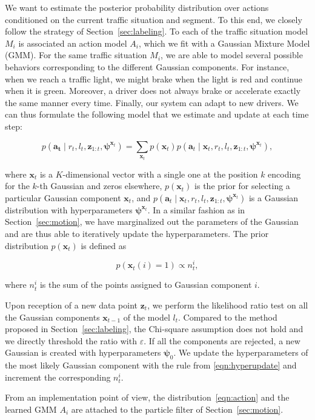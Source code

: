 We want to estimate the posterior probability distribution over actions
conditioned on the current traffic situation and segment. To this end, we
closely follow the strategy of Section~\ref{sec:labeling}. To each of the
traffic situation model $M_i$ is associated an action model $A_i$, which we fit
with a Gaussian Mixture Model (GMM). For the same traffic situation $M_i$, we
are able to model several possible behaviors corresponding to the different
Gaussian components. For instance, when we reach a traffic light, we might brake
when the light is red and continue when it is green. Moreover, a driver does not
always brake or accelerate exactly the same manner every time. Finally, our
system can adapt to new drivers. We can thus formulate the following model that
we estimate and update at each time step:

\begin{equation}
\label{eqn:action}
p(\mathbf{a_t} \mid r_t, l_t,\mathbf{z}_{1:t},\boldsymbol{\psi}^{\mathbf{x}_t})=
\sum_{\mathbf{x}_t} p(\mathbf{x}_t)p(\mathbf{a}_t\mid\mathbf{x}_t,r_t,l_t,
\mathbf{z}_{1:t},\boldsymbol{\psi}^{\mathbf{x}_t}),
\end{equation}

where $\mathbf{x}_t$ is a $K$-dimensional vector with a single one at the
position $k$ encoding for the $k$-th Gaussian and zeros elsewhere,
$p(\mathbf{x}_t)$ is the prior for selecting a particular Gaussian component
$\mathbf{x}_t$, and $p(\mathbf{a}_t\mid\mathbf{x}_t,r_t,l_t,
\mathbf{z}_{1:t},\boldsymbol{\psi}^{\mathbf{x}_t})$ is a Gaussian distribution
with hyperparameters $\boldsymbol{\psi}^{\mathbf{x}_t}$. In a similar fashion as
in Section~\ref{sec:motion}, we have marginalized out the parameters of the
Gaussian and are thus able to iteratively update the hyperparameters. The
prior distribution $p(\mathbf{x}_t)$ is defined as

\begin{equation}
\label{eqn:gaussianprior}
p(\mathbf{x}_t(i)=1)\propto n_t^i,
\end{equation}

where $n_t^i$ is the sum of the points assigned to Gaussian component $i$.

Upon reception of a new data point $\mathbf{z}_t$, we perform the likelihood
ratio test on all the Gaussian components $\mathbf{x}_{t-1}$ of the model $l_t$.
Compared to the method proposed in Section~\ref{sec:labeling}, the Chi-square
assumption does not hold and we directly threshold the ratio with $\varepsilon$.
If all the components are rejected, a new Gaussian is created with
hyperparameters $\boldsymbol{\psi}_0$. We update the hyperparameters of the most
likely Gaussian component with the rule from \eqref{eqn:hyperupdate} and
increment the corresponding $n_t^i$.

From an implementation point of view, the distribution~\eqref{eqn:action} and
the learned GMM $A_i$ are attached to the particle filter of
Section~\ref{sec:motion}.
